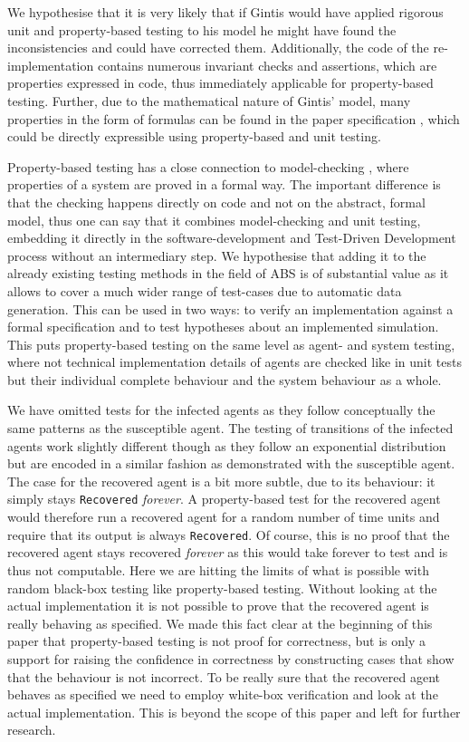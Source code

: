 We hypothesise that it is very likely that if Gintis \cite{gintis_emergence_2006} would have applied rigorous unit and property-based testing to his model he might have found the inconsistencies and could have corrected them. Additionally, the code of the re-implementation \cite{evensen_extensible_2010} contains numerous invariant checks and assertions, which are properties expressed in code, thus immediately applicable for property-based testing. Further, due to the mathematical nature of Gintis' model, many properties in the form of formulas can be found in the paper specification \cite{gintis_emergence_2006}, which could be directly expressible using property-based and unit testing. 

Property-based testing has a close connection to model-checking \cite{mcmillan_symbolic_1993}, where properties of a system are proved in a formal way. The important difference is that the checking happens directly on code and not on the abstract, formal model, thus one can say that it combines model-checking and unit testing, embedding it directly in the software-development and Test-Driven Development process without an intermediary step. We hypothesise that adding it to the already existing testing methods in the field of ABS is of substantial value as it allows to cover a much wider range of test-cases due to automatic data generation. This can be used in two ways: to verify an implementation against a formal specification and to test hypotheses about an implemented simulation. This puts property-based testing on the same level as agent- and system testing, where not technical implementation details of agents are checked like in unit tests but their individual complete behaviour and the system behaviour as a whole.

\medskip

We have omitted tests for the infected agents as they follow conceptually the same patterns as the susceptible agent. The testing of transitions of the infected agents work slightly different though as they follow an exponential distribution but are encoded in a similar fashion as demonstrated with the susceptible agent. The case for the recovered agent is a bit more subtle, due to its behaviour: it simply stays \texttt{Recovered} \textit{forever}. A property-based test for the recovered agent would therefore run a recovered agent for a random number of time units and require that its output is always \texttt{Recovered}. Of course, this is no proof that the recovered agent stays recovered \textit{forever} as this would take forever to test and is thus not computable. Here we are hitting the limits of what is possible with random black-box testing like property-based testing. Without looking at the actual implementation it is not possible to prove that the recovered agent is really behaving as specified. We made this fact clear at the beginning of this paper that property-based testing is not proof for correctness, but is only a support for raising the confidence in correctness by constructing cases that show that the behaviour is not incorrect. To be really sure that the recovered agent behaves as specified we need to employ white-box verification and look at the actual implementation. This is beyond the scope of this paper and left for further research.

